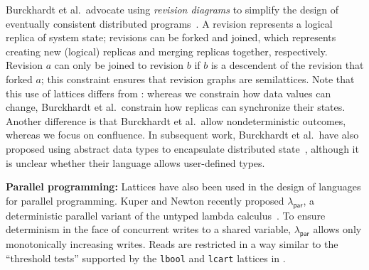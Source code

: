 Burckhardt et al.\ advocate using \emph{revision diagrams} to simplify the
design of eventually consistent distributed programs~\cite{Burckhardt2012a}. A
revision represents a logical replica of system state; revisions can be forked
and joined, which represents creating new (logical) replicas and merging
replicas together, respectively. Revision $a$ can only be joined to revision $b$
if $b$ is a descendent of the revision that forked $a$; this constraint ensures
that revision graphs are semilattices. Note that this use of lattices differs
from \lang: whereas we constrain how data values can change, Burckhardt et al.\
constrain how replicas can synchronize their states. Another difference is that
Burckhardt et al.\ allow nondeterministic outcomes, whereas we focus on
confluence. In subsequent work, Burckhardt et al.\ have also proposed using
abstract data types to encapsulate distributed state~\cite{Burckhardt2012b},
although it is unclear whether their language allows user-defined types.





\vspace{0.5em}\noindent
\textbf{Parallel programming:} Lattices have also been used in the design of
languages for parallel programming. Kuper and Newton recently proposed
$\lambda_{\textsf{par}}$, a deterministic parallel variant of the untyped lambda
calculus~\cite{Kuper2012}. To ensure determinism in the face of concurrent
writes to a shared variable, $\lambda_{\textsf{par}}$ allows only monotonically
increasing writes. Reads are restricted in a way similar to the ``threshold
tests'' supported by the \texttt{lbool} and \texttt{lcart} lattices in \lang.

